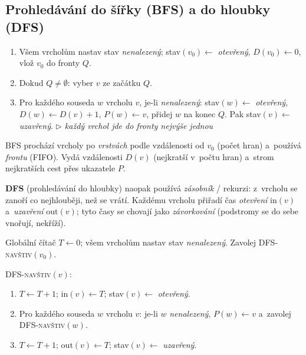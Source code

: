 \documentclass[11pt,a4paper]{article}
\newcommand{\cmt}[1]{\hfill{\footnotesize\itshape\textcolor{black!55}{$\triangleright$ #1}}}
\begin{document}
\subsection{Prohledávání do šířky (BFS) a do hloubky (DFS)}

\begin{algo}
\begin{enumerate}
  \item Všem vrcholům nastav stav \emph{nenalezený}; stav$(v_0)\leftarrow$ \emph{otevřený}, $D(v_0)\leftarrow0$, vlož $v_0$ do fronty $Q$.
  \item Dokud $Q\ne\emptyset$: vyber $v$ ze začátku $Q$.
  \item Pro každého souseda $w$ vrcholu $v$, je-li \emph{nenalezený}: stav$(w)\leftarrow$ \emph{otevřený}, $D(w)\leftarrow D(v)+1$, $P(w)\leftarrow v$, přidej $w$ na konec $Q$. Pak stav$(v)\leftarrow$ \emph{uzavřený}. \cmt{každý vrchol jde do fronty nejvýše jednou}
\end{enumerate}
\end{algo}

BFS prochází vrcholy po \emph{vrstvách} podle vzdálenosti od $v_0$ (počet hran) a~používá \emph{frontu} (FIFO). Vydá vzdálenosti $D(v)$ (nejkratší v~počtu hran) a~strom nejkratších cest přes ukazatele $P$.

\textbf{DFS} (prohledávání do hloubky) naopak používá \emph{zásobník} / rekurzi: z~vrcholu se zanoří co nejhlouběji, než se vrátí. Každému vrcholu přiřadí čas \emph{otevření} $\mathrm{in}(v)$ a~\emph{uzavření} $\mathrm{out}(v)$; tyto časy se chovají jako \emph{závorkování} (podstromy se do sebe vnořují, nekříží).

\begin{algo}
Globální čítač $T\leftarrow0$; všem vrcholům nastav stav \emph{nenalezený}. Zavolej \textsc{DFS-navštiv}$(v_0)$.
\smallskip

\noindent\textsc{DFS-navštiv}$(v)$:
\begin{enumerate}
  \item $T\leftarrow T+1$; $\mathrm{in}(v)\leftarrow T$; stav$(v)\leftarrow$ \emph{otevřený}.
  \item Pro každého souseda $w$ vrcholu $v$: je-li $w$ \emph{nenalezený}, $P(w)\leftarrow v$ a~zavolej \textsc{DFS-navštiv}$(w)$.
  \item $T\leftarrow T+1$; $\mathrm{out}(v)\leftarrow T$; stav$(v)\leftarrow$ \emph{uzavřený}.
\end{enumerate}
\end{algo}
\end{document}
